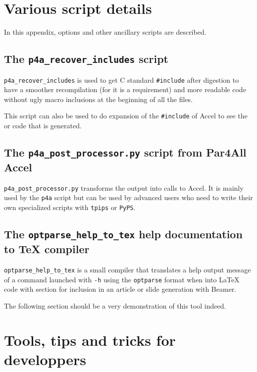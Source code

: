 \documentclass[a4paper]{article}
\begin{document}
\appendix


\section{Various script details}
\label{sec:vari-script-deta}

In this appendix, options and other ancillary scripts are described.


\subsection{The \protect\texttt{p4a\_recover\_includes} script}
\label{sec:p4a_recover_includes}

\verb|p4a_recover_includes| is used to get C standard \verb|#include|
after \Apips digestion to have a smoother recompilation (for \Acuda it is a
requirement) and more readable code without ugly macro inclusions at
the beginning of all the files.

This script can also be used to do expansion of the \verb|#include| of
\Apfa Accel to see the \Acuda or \Aopenmp code
that is generated.




\subsection{The \protect\texttt{p4a\_post\_processor.py} script from
  Par4All Accel}
\label{sec:p4a_p-script-from}

\verb|p4a_post_processor.py| transforms the \Apips
output into calls to \Apfa Accel. It is mainly used by the \texttt{p4a}
script but can be used by advanced users who need to write their own
specialized \Apips scripts with \texttt{tpips} or \texttt{PyPS}.




\subsection{The \protect\texttt{optparse\_help\_to\_tex} help
  documentation to \TeX{} compiler}
\label{sec:help-docum-tex}

\verb|optparse_help_to_tex| is a small compiler that translates a help
output message of a command launched with \texttt{-h} using the
\texttt{optparse} format when into La\TeX{} code with section for
inclusion in
an article or slide generation with Beamer.

The following section should be a very demonstration of this tool
indeed. \smiley




\section{Tools, tips and tricks for developpers}

\end{document}
